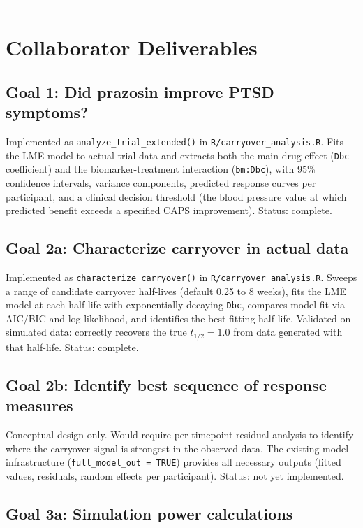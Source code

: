 \documentclass[11pt]{article}
\begin{document}
\bigskip\noindent\rule{\textwidth}{0.4pt}\bigskip

\section{Collaborator Deliverables}

\subsection{Goal 1: Did prazosin improve PTSD symptoms?}

Implemented as \texttt{analyze\_trial\_extended()} in
\texttt{R/carryover\_analysis.R}. Fits the LME model to actual trial data
and extracts both the main drug effect (\texttt{Dbc} coefficient) and
the biomarker-treatment interaction (\texttt{bm:Dbc}), with 95\%
confidence intervals, variance components, predicted response
curves per participant, and a clinical decision threshold
(the blood pressure value at which predicted benefit exceeds a
specified CAPS improvement). Status: complete.

\subsection{Goal 2a: Characterize carryover in actual data}

Implemented as \texttt{characterize\_carryover()} in
\texttt{R/carryover\_analysis.R}. Sweeps a range of candidate
carryover half-lives (default 0.25 to 8 weeks), fits the LME
model at each half-life with exponentially decaying \texttt{Dbc},
compares model fit via AIC/BIC and log-likelihood, and
identifies the best-fitting half-life. Validated on simulated
data: correctly recovers the true $t_{1/2} = 1.0$ from data
generated with that half-life. Status: complete.

\subsection{Goal 2b: Identify best sequence of response measures}

Conceptual design only. Would require per-timepoint residual
analysis to identify where the carryover signal is strongest
in the observed data. The existing model infrastructure
(\texttt{full\_model\_out = TRUE}) provides all necessary outputs
(fitted values, residuals, random effects per participant).
Status: not yet implemented.

\subsection{Goal 3a: Simulation power calculations}
\end{document}
